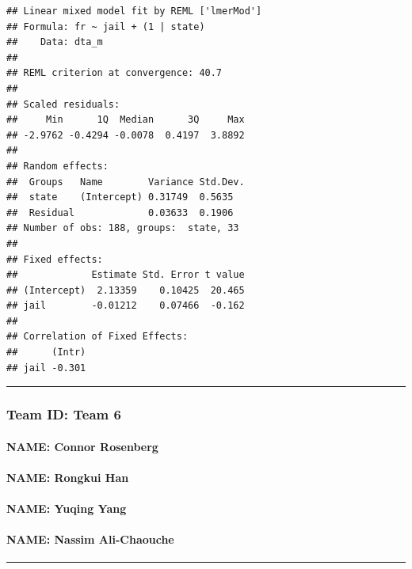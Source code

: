 \documentclass[]{article}
\let\oldparagraph\paragraph
\renewcommand{\paragraph}[1]{\oldparagraph{#1}\mbox{}}
\begin{document}
\begin{verbatim}
## Linear mixed model fit by REML ['lmerMod']
## Formula: fr ~ jail + (1 | state)
##    Data: dta_m
## 
## REML criterion at convergence: 40.7
## 
## Scaled residuals: 
##     Min      1Q  Median      3Q     Max 
## -2.9762 -0.4294 -0.0078  0.4197  3.8892 
## 
## Random effects:
##  Groups   Name        Variance Std.Dev.
##  state    (Intercept) 0.31749  0.5635  
##  Residual             0.03633  0.1906  
## Number of obs: 188, groups:  state, 33
## 
## Fixed effects:
##             Estimate Std. Error t value
## (Intercept)  2.13359    0.10425  20.465
## jail        -0.01212    0.07466  -0.162
## 
## Correlation of Fixed Effects:
##      (Intr)
## jail -0.301
\end{verbatim}

\begin{center}\rule{0.5\linewidth}{\linethickness}\end{center}

\hypertarget{team-id-team-6}{%
\subsubsection{Team ID: Team 6}\label{team-id-team-6}}

\hypertarget{name-connor-rosenberg}{%
\paragraph{NAME: Connor Rosenberg}\label{name-connor-rosenberg}}

\hypertarget{name-rongkui-han}{%
\paragraph{NAME: Rongkui Han}\label{name-rongkui-han}}

\hypertarget{name-yuqing-yang}{%
\paragraph{NAME: Yuqing Yang}\label{name-yuqing-yang}}

\hypertarget{name-nassim-ali-chaouche}{%
\paragraph{NAME: Nassim Ali-Chaouche}\label{name-nassim-ali-chaouche}}

\begin{center}\rule{0.5\linewidth}{\linethickness}\end{center}
\end{document}
